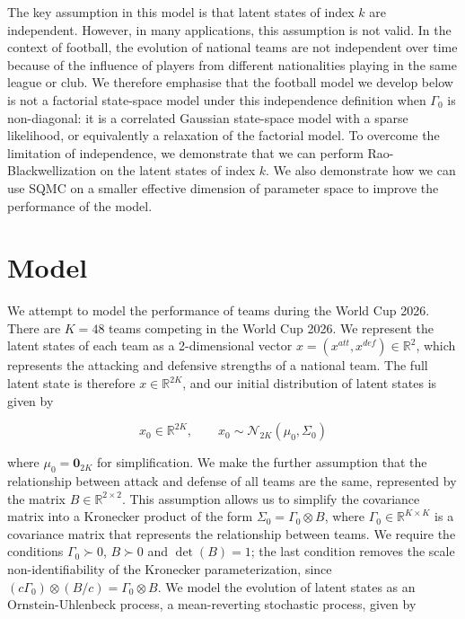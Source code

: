 The key assumption in this model is that latent states of index $k$ are independent. However, in many applications, this assumption is not valid. In the context of football, the evolution of national teams are not independent over time because of the influence of players from different nationalities playing in the same league or club. We therefore emphasise that the football model we develop below is not a factorial state-space model under this independence definition when $\Gamma_0$ is non-diagonal: it is a correlated Gaussian state-space model with a sparse likelihood, or equivalently a relaxation of the factorial model. To overcome the limitation of independence, we demonstrate that we can perform Rao-Blackwellization on the latent states of index $k$. We also demonstrate how we can use SQMC on a smaller effective dimension of parameter space to improve the performance of the model.

\section{Model}
\label{sec:model}
We attempt to model the performance of teams during the World Cup 2026. There are $K = 48$ teams competing in the World Cup 2026. We represent the latent states of each team as a 2-dimensional vector $x = (x^{att}, x^{def}) \in \mathbb{R}^2$, which represents the attacking and defensive strengths of a national team. The full latent state is therefore $x \in \mathbb{R}^{2K}$, and our initial distribution of latent states is given by 

\begin{equation}
    x_0 \in \mathbb{R}^{2K}, \qquad x_0 \sim \mathcal{N}_{2K}(\mu_0, \Sigma_0)
\end{equation}

where $\mu_0 = \mathbf{0}_{2K}$ for simplification. We make the further assumption that the relationship between attack and defense of all teams are the same, represented by the matrix $B \in \mathbb{R}^{2 \times 2}$. This assumption allows us to simplify the covariance matrix into a Kronecker product of the form $\Sigma_0 = \Gamma_0 \otimes B$, where $\Gamma_0 \in \mathbb{R}^{K \times K}$ is a covariance matrix that represents the relationship between teams. We require the conditions $\Gamma_0 \succ 0$, $B \succ 0$ and $\det(B) = 1$; the last condition removes the scale non-identifiability of the Kronecker parameterization, since $(c\Gamma_0) \otimes (B/c) = \Gamma_0 \otimes B$. We model the evolution of latent states as an Ornstein-Uhlenbeck process, a mean-reverting stochastic process, given by

